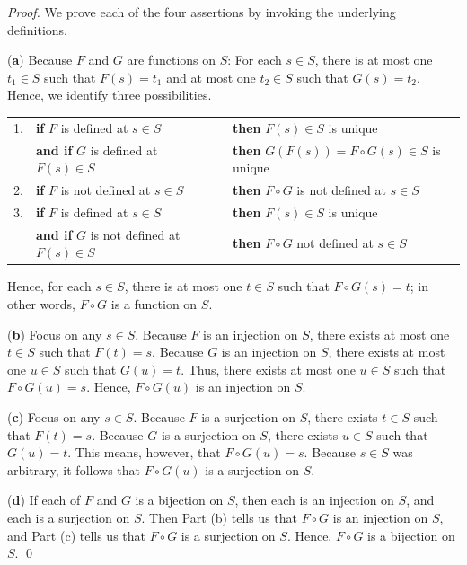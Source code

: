 \begin{proof}
We prove each of the four assertions by invoking the underlying definitions.

\noindent ({\bf a})
Because $F$ and $G$ are functions on $S$: For each $s \in S$, there is at most one $t_1 \in S$ such that $F(s) = t_1$ and at most one $t_2 \in S$ such that $G(s) = t_2$.  Hence, we identify three possibilities.

\smallskip

\begin{tabular}{lllll}
1. &
{\bf if}
$F$ is defined at $s \in S$  & & & {\bf then} $F(s) \in S$ is unique \\
  &
{\bf and if} $G$ is defined at $F(s) \in S$ & & & {\bf then} $G(F(s))
= F \circ G(s) \in S$ is unique \\
2. &
{\bf if}
$F$ is not defined at $s \in S$ & & & {\bf then} $F \circ G$ is not
defined at $s \in S$ \\ 
3. & 
{\bf if}
$F$ is defined at $s \in S$ & & & {\bf then} $F(s) \in S$ is unique \\
  &
{\bf and if} $G$ is not defined at $F(s) \in S$ & & & {\bf then}
$F \circ G$ not defined at $s \in S$ 
\end{tabular}

\smallskip

\noindent
Hence, for each $s \in S$, there is at most one $t \in S$ such that $F \circ G(s) = t$; in other words, $F \circ G$ is a function on $S$.

\medskip

\noindent ({\bf b})
Focus on any $s \in S$.  Because $F$ is an injection on $S$, there exists at most one $t \in S$ such that $F(t) = s$.  Because $G$ is an injection on $S$, there exists at most one $u \in S$ such that $G(u) = t$.  Thus, there exists at most one $u \in S$ such that $F \circ G(u) = s$.  Hence, $F \circ G(u)$ is an injection on $S$.

\medskip

\noindent ({\bf c})
Focus on any $s \in S$.  Because $F$ is a surjection on $S$, there exists $t \in S$ such that $F(t) = s$.  Because $G$ is a surjection on $S$, there exists $u \in S$ such that $G(u) = t$.  This means, however, that $F \circ G(u) = s$.  Because $s \in S$ was arbitrary, it follows that $F \circ G(u)$ is a surjection on $S$.

\medskip

\noindent ({\bf d})
If each of $F$ and $G$ is a bijection on $S$, then each is an injection on $S$, and each is a surjection on $S$.  Then Part (b) tells us that $F \circ G$ is an injection on $S$, and Part (c) tells
us that $F \circ G$ is a surjection on $S$.  Hence, $F \circ G$ is a bijection on $S$.  \qed
\end{proof}

